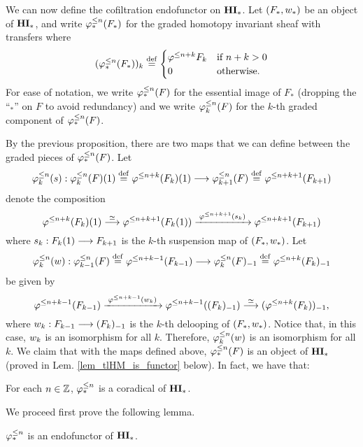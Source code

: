 We can now define the cofiltration endofunctor on $\HM$. Let
$(F_*, \deloop_*)$ be an object of $\HM$, and write $\tlHM{n}(F_*)$ 
for the graded homotopy invariant sheaf with transfers where
\[
(\tlHM{n}(F_*))_k \defeq
\begin{cases}
   \tlHI{n + k}F_k & \textrm{if } n + k > 0 \\
   0               & \textrm{otherwise}.
\end{cases}
\]
For ease of notation, we write $\tlHM{n}(F)$ for the essential 
image of $F_*$ (dropping the ``$_*$'' on $F$ to avoid 
redundancy) and we write $\tlHM[k]{n}(F)$ for the $k$-th graded 
component of $\tlHM{n}(F)$.

By the previous proposition, there are two maps that we can
define between the graded pieces of $\tlHM{n}(F)$. Let
\[
\suspTL[k]{n} : \LHI{\tlHM[k]{n}(F)} \defeq 
   \LHI{\tlHI{n + k}(F_k)} \to \tlHM[k + 1]{n}(F) \defeq 
   \tlHI{n + k + 1}(F_{k + 1})
\]
denote the composition
\begin{equation}\label{eq_susp_def}
\LHI{\tlHI{n + k}(F_k)} \stackrel{\simeq}{\to} 
   \tlHI{n + k + 1}(\LHI{F_k}) 
   \xrightarrow{\;\tlHI{n + k + 1}(\susp_k)\;} 
   \tlHI{n + k + 1}(F_{k + 1})
\end{equation}
where $\susp_k: \LHI{F_k} \to F_{k + 1}$ is the $k$-th suspension 
map of $(F_*, \deloop_*)$. Let
\[
\deloopTL[k]{n} : \tlHM[k - 1]{n}(F) \defeq 
   \tlHI{n + k - 1}(F_{k - 1}) \to \RHI{\tlHM[k]{n}(F)} \defeq 
   \RHI{\tlHI{n + k}(F_{k})} 
\]
be given by
\begin{equation}\label{eq_deloop_def}
\tlHI{n + k - 1}(F_{k - 1})
   \xrightarrow{\;\tlHI{n + k - 1}(\deloop_k)\;} 
   \tlHI{n + k - 1}(\RHI{(F_k)}) \stackrel{\simeq}{\to} 
   \RHI{(\tlHI{n + k}(F_k))},
\end{equation}
where $\deloop_k: F_{k - 1} \to \RHI{(F_k)}$ is the $k$-th delooping
of $(F_*, \deloop_*)$. Notice that, in this case, $\deloop_k$ is
an isomorphism for all $k$. Therefore, $\deloopTL[k]{n}$ is an 
isomorphism for all $k$. We claim that with the maps defined above,
$\tlHM{n}(F)$ is an object of $\HM$ (proved in Lem. 
\ref{lem_tlHM_is_functor} below). In fact, we have that:

\begin{thm}\label{thm_tlHM_funct}
For each $n \in \Z$, $\tlHM{n}$ is a coradical of $\HM$.
\end{thm}

We proceed first prove the following lemma.

\begin{lem}\label{lem_tlHM_is_functor}
$\tlHM{n}$ is an endofunctor of $\HM$.
\end{lem}

